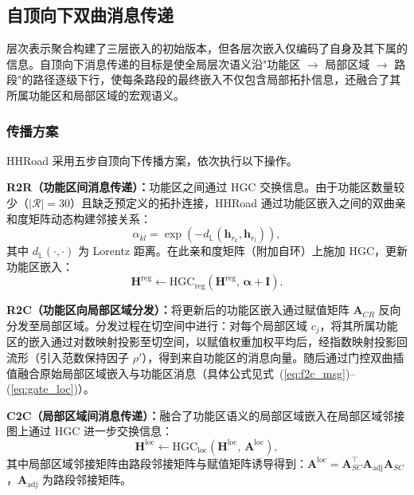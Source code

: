 \subsection{自顶向下双曲消息传递}
\label{sec:message_passing}

层次表示聚合构建了三层嵌入的初始版本，但各层次嵌入仅编码了自身及其下属的信息。自顶向下消息传递的目标是使全局层次语义沿"功能区 $\to$ 局部区域 $\to$ 路段"的路径逐级下行，使每条路段的最终嵌入不仅包含局部拓扑信息，还融合了其所属功能区和局部区域的宏观语义。

\subsubsection{传播方案}

HHRoad 采用五步自顶向下传播方案，依次执行以下操作。

\textbf{R2R（功能区间消息传递）：}功能区之间通过 HGC 交换信息。由于功能区数量较少（$|\mathcal{R}|=30$）且缺乏预定义的拓扑连接，HHRoad 通过功能区嵌入之间的双曲亲和度矩阵动态构建邻接关系：
\begin{equation}
    \alpha_{kl} = \exp\!\left(-d_{\mathbb{L}}(\mathbf{h}_{r_k}, \mathbf{h}_{r_l})\right),
    \label{eq:region_affinity}
\end{equation}
其中 $d_{\mathbb{L}}(\cdot, \cdot)$ 为 Lorentz 距离。在此亲和度矩阵（附加自环）上施加 HGC，更新功能区嵌入：
\begin{equation}
    \mathbf{H}^{\text{reg}} \leftarrow \text{HGC}_{\text{reg}}\!\left(\mathbf{H}^{\text{reg}},\, \boldsymbol{\alpha} + \mathbf{I}\right).
    \label{eq:r2r}
\end{equation}

\textbf{R2C（功能区向局部区域分发）：}将更新后的功能区嵌入通过赋值矩阵 $\mathbf{A}_{CR}$ 反向分发至局部区域。分发过程在切空间中进行：对每个局部区域 $c_j$，将其所属功能区的嵌入通过对数映射投影至切空间，以赋值权重加权平均后，经指数映射投影回流形（引入范数保持因子 $\rho'$），得到来自功能区的消息向量。随后通过门控双曲插值融合原始局部区域嵌入与功能区消息（具体公式见式~(\ref{eq:f2c_msg})--(\ref{eq:gate_loc})）。

\textbf{C2C（局部区域间消息传递）：}融合了功能区语义的局部区域嵌入在局部区域邻接图上通过 HGC 进一步交换信息：
\begin{equation}
    \mathbf{H}^{\text{loc}} \leftarrow \text{HGC}_{\text{loc}}\!\left(\mathbf{H}^{\text{loc}},\, \mathbf{A}^{\text{loc}}\right),
    \label{eq:c2c}
\end{equation}
其中局部区域邻接矩阵由路段邻接矩阵与赋值矩阵诱导得到：$\mathbf{A}^{\text{loc}} = \mathbf{A}_{SC}^\top \mathbf{A}_{\text{adj}} \mathbf{A}_{SC}$，$\mathbf{A}_{\text{adj}}$ 为路段邻接矩阵。

